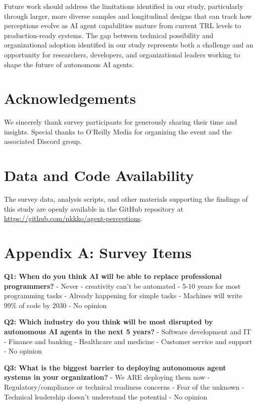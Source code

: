 \documentclass{article}
\begin{document}
Future work should address the limitations identified in our study,
particularly through larger, more diverse samples and longitudinal
designs that can track how perceptions evolve as AI agent capabilities
mature from current TRL levels to production-ready systems. The gap
between technical possibility and organizational adoption identified in
our study represents both a challenge and an opportunity for
researchers, developers, and organizational leaders working to shape the
future of autonomous AI agents.

\section{Acknowledgements}\label{acknowledgements}

We sincerely thank survey participants for generously sharing their time and insights. Special thanks to O'Reilly Media for organizing the event and the associated Discord group.

\section*{Data and Code Availability} %
The survey data, analysis scripts, and other materials supporting the findings of this study are openly available in the GitHub repository at \url{https://github.com/nkkko/agent-perceptions}.




\section{Appendix A: Survey Items}\label{appendix-a-survey-items}

\textbf{Q1: When do you think AI will be able to replace professional
programmers?} - Never - creativity can't be automated - 5-10 years for
most programming tasks - Already happening for simple tasks - Machines
will write 99\% of code by 2030 - No opinion

\textbf{Q2: Which industry do you think will be most disrupted by
autonomous AI agents in the next 5 years?} - Software development and IT
- Finance and banking - Healthcare and medicine - Customer service and
support - No opinion

\textbf{Q3: What is the biggest barrier to deploying autonomous agent
systems in your organization?} - We ARE deploying them now -
Regulatory/compliance or technical readiness concerns - Fear of the
unknown - Technical leadership doesn't understand the potential - No
opinion
\end{document}
